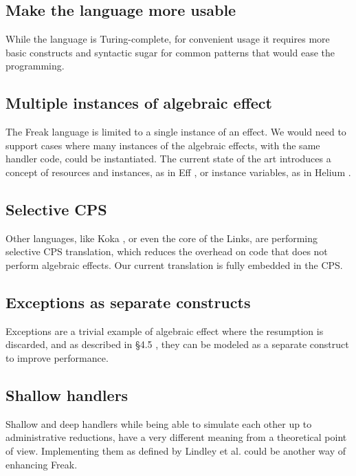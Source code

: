 \documentclass{article}
\theoremstyle{definition}
\theoremstyle{lemma}
\theoremstyle{observation}
\theoremstyle{theorem}
\begin{document}
    \subsection{Make the language more usable}

    While the language is Turing-complete, for convenient usage it
    requires more basic constructs and syntactic sugar for common patterns
    that would ease the programming.

    \subsection{Multiple instances of algebraic effect}

    The Freak language is limited to a single instance of an effect. We would
    need to support cases where many instances of the algebraic effects, with
    the same handler code, could be instantiated. The current state of the
    art introduces a concept of resources and instances, as in Eff \cite{programming-in-eff},
    or instance variables, as in Helium \cite{binders-labels}.

    \subsection{Selective CPS}

    Other languages, like Koka \cite{leijen-koka}, or even the core of the Links, are
    performing selective CPS translation, which reduces the overhead on code
    that does not perform algebraic effects. Our current translation is fully
    embedded in the CPS.

    \subsection{Exceptions as separate constructs}

    Exceptions are a trivial example of algebraic effect where the resumption is
    discarded, and as described in \S 4.5 \cite{handlers-cps}, they can be modeled
    as a separate construct to improve performance.

    \subsection{Shallow handlers}

    Shallow and deep handlers while being able to simulate each other up to
    administrative reductions, have a very different meaning from a theoretical
    point of view. Implementing them as defined by Lindley et al. \cite{shallow-handlers} could
    be another way of enhancing Freak.

\printbibliography
\end{document}
